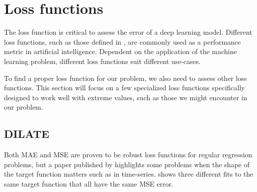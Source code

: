 
\section{Loss functions}
\label{section:RelatedWork:Loss}

The loss function is critical to assess the error of a deep learning model.
Different loss functions, such as those defined in ,
are commonly used as a performance metric in artificial intelligence.
Dependent on the application of the machine learning problem, different loss functions suit different use-cases.

To find a proper loss function for our problem, we also need to assess other loss functions.
This section will focus on a few specialized loss functions specifically designed to work well with extreme values, such as those we might encounter in our problem.

\subsection{DILATE}

Both MAE and MSE are proven to be robust loss functions for regular regression problems,
but a paper published by \citeauthor{Guen2019} highlights some problems when the shape of the target function matters
such as in time-series.
 shows three different fits to the same target function that all have
the same MSE error.

